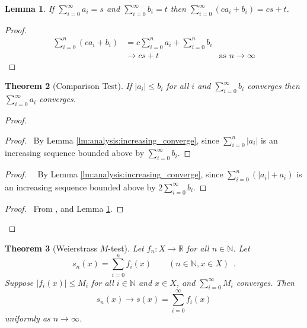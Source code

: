 \documentclass{book}
\newtheorem{lm}{Lemma}[chapter]
\newtheorem{thm}[lm]{Theorem}
\theoremstyle{definition}
\begin{document}
  \begin{lm}
    \label{lm:analysis:series_linear}
    If $\sum_{i=0}^\infty a_i = s$ and $\sum_{i=0}^\infty b_i = t$ then 
    $\sum_{i=0}^\infty (c a_i + b_i) = cs + t$.
  \end{lm}
  
  \begin{proof}
    \begin{align*}
      \sum_{i=0}^n (c a_i + b_i) & = c \sum_{i=0}^n a_i + \sum_{i=0}^n b_i \\
      & \rightarrow c s + t & \text{as } n \rightarrow \infty
    \end{align*}
  \end{proof}
  
  \begin{thm}[Comparison Test]
    If $|a_i| \leq b_i$ for all $i$ and $\sum_{i=0}^\infty b_i$ converges then 
    $\sum_{i=0}^\infty a_i$ converges.
  \end{thm}
  
  \begin{proof}
    \pf
    \begin{proof}
      \pf\ By Lemma \ref{lm:analysis:increasing_converge}, since $\sum_{i=0}^n 
      |a_i|$ is an increasing sequence bounded above by $\sum_{i=0}^\infty b_i$.
    \end{proof}
    \begin{proof}\
      \pf\ By Lemma \ref{lm:analysis:increasing_converge}, since $\sum_{i=0}^n 
      (|a_i| + a_i)$ is an increasing sequence bounded above by $2 
      \sum_{i=0}^\infty 
      b_i$.
    \end{proof}
    \begin{proof}
      \pf\ From ,  and Lemma 
      \ref{lm:analysis:series_linear}.
    \end{proof}
  \end{proof}
  
  \begin{thm}[Weierstrass $M$-test]
    Let $f_n : X \rightarrow \mathbb{R}$ for all $n \in \mathbb{N}$. Let
    \[ s_n(x) = \sum_{i=0}^n f_i(x) \qquad (n \in \mathbb{N}, x \in X) \enspace 
    . 
    \]
    Suppose $|f_i(x)| \leq M_i$ for all $i \in \mathbb{N}$ and $x \in X$, and 
    $\sum_{i=0}^\infty M_i$ converges. Then
    \[ s_n(x) \rightarrow s(x) = \sum_{i=0}^\infty f_i(x) \]
    uniformly as $n \rightarrow \infty$.
  \end{thm}
  
\end{document}
